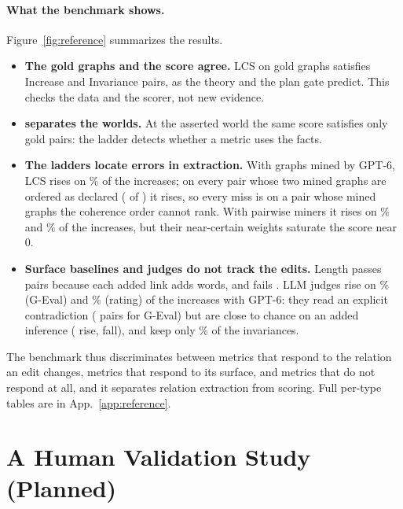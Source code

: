 \documentclass[11pt]{article}
\begin{document}
\paragraph{What the benchmark shows.} Figure~\ref{fig:reference} summarizes the results.
\begin{itemize}[leftmargin=1.2em,itemsep=1pt,topsep=2pt]
\item \textbf{The gold graphs and the score agree.} LCS on gold graphs satisfies
  \sThreeGoldLamInc{} Increase and \sThreeGoldLamInv{} Invariance pairs, as the theory and the
  plan gate predict. This checks the data and the scorer, not new evidence.
\item \textbf{ separates the worlds.} At the asserted world the same score satisfies
  only \sThreeGoldLamASign{} gold  pairs: the ladder detects whether a metric uses the
  facts.
\item \textbf{The ladders locate errors in extraction.} With graphs mined by GPT-6, LCS rises on
  \sThreeGraphGptLamIncPct\% of the increases; on every pair whose two mined graphs are ordered as
  declared (\sThreeGraphGptDomForward{} of \sThreeNIncPairs) it rises, so every miss is on a pair
  whose mined graphs the coherence order cannot rank. With pairwise miners it rises on
  \sThreePairOssLamIncPct\% and \sThreePairLlamaLamIncPct\% of the increases, but their
  near-certain weights saturate the score near $0$.
\item \textbf{Surface baselines and judges do not track the edits.} Length passes
  \sThreeBCtlLengthChain{}  pairs because each added link adds words, and fails
  . LLM judges rise on \sThreeBGevalGptIncPct\% (G-Eval) and
  \sThreeBDirectGptIncPct\% (rating) of the increases with GPT-6: they read an explicit
  contradiction (\sThreeBGevalGptConflict{}  pairs for G-Eval) but are close to
  chance on an added inference (\sThreeBGevalGptChain{} rise, \sThreeBGevalGptChainFalls{} fall),
  and keep only \sThreeBGevalGptInvTolUPct\% of the invariances.
\end{itemize}
The benchmark thus discriminates between metrics that respond to the relation an edit changes,
metrics that respond to its surface, and metrics that do not respond at all, and it separates
relation extraction from scoring. Full per-type tables are in App.~\ref{app:reference}.

\section{A Human Validation Study (Planned)}
\label{sec:study}
\end{document}
